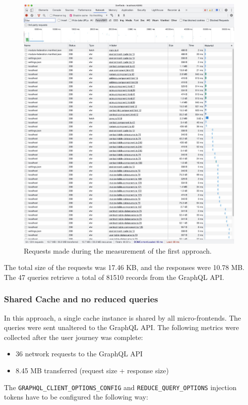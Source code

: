 \ifshowImages
\begin{figure}[H]
  \centering
  \includegraphics[width=0.75\linewidth]{images/results/1-attempt/no-shared-cache-no-reduction.jpg}
  \caption{Requests made during the measurement of the first approach.}\label{fig:results:no-shared-cache-no-reduction}
\end{figure}
\fi

\noindent The total size of the requests was 17.46 KB, and the responses were 10.78 MB. The 47 queries retrieve a total of 81510 records from the GraphQL  \ac{API}.

\subsubsection{Shared Cache and no reduced queries}\label{subsubsection:results:performance-measurement:shared-cache-no-reduction}

In this approach, a single cache instance is shared by all micro-frontends. The queries were sent unaltered to the GraphQL \ac{API}. The following metrics were collected after the user journey was complete:

\begin{itemize}
  \item 36 network requests to the GraphQL \ac{API}
  \item 8.45 MB transferred (request size + response size)
\end{itemize}

\noindent The \texttt{GRAPHQL\_CLIENT\_OPTIONS\_CONFIG} and \texttt{REDUCE\_QUERY\_OPTIONS} injection tokens have to be configured the following way:

